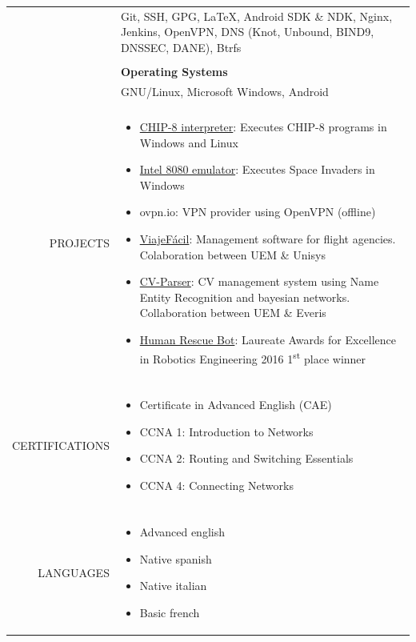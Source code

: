 \documentclass[a4paper, 11pt]{article}
\begin{document}
\begin{longtable}{rp{11cm}}
    & Git, SSH, GPG, \LaTeX, Android SDK \& NDK, Nginx, Jenkins, OpenVPN, DNS (Knot, Unbound, BIND9, DNSSEC, DANE), Btrfs\\
    \\
    & {\bf Operating Systems}\\
    & GNU/Linux, Microsoft Windows, Android\\
    \\
    PROJECTS
    & \vspace{-8mm}
    \begin{itemize}[leftmargin=0cm,label={}]
        \item \href{https://github.com/hugo19941994/CHIP8-Emu}{CHIP-8 interpreter}: Executes CHIP-8 programs in Windows and Linux
        \item \href{https://github.com/hugo19941994/SpaceInvaders-Emu}{Intel 8080 emulator}: Executes Space Invaders in Windows
        \item {ovpn.io}: VPN provider using OpenVPN (offline)
        \item \href{https://github.com/hugo19941994/ViajeFacil}{ViajeFácil}: Management software for flight agencies. Colaboration between UEM \& Unisys
        \item \href{https://github.com/hugo19941994/CV-Parser}{CV-Parser}: CV management system using Name Entity Recognition and bayesian networks. Collaboration between UEM \& Everis
        \item \href{https://github.com/hugo19941994/robot}{Human Rescue Bot}: Laureate Awards for Excellence in Robotics Engineering 2016 1\textsuperscript{st} place winner
    \end{itemize}\\
    \\
    CERTIFICATIONS
    & \vspace{-8mm}
    \begin{itemize}[leftmargin=0cm,label={},noitemsep]
        \item Certificate in Advanced English (CAE)
        \item CCNA 1: Introduction to Networks
        \item CCNA 2: Routing and Switching Essentials
        \item CCNA 4: Connecting Networks
    \end{itemize}\\
    \\
    LANGUAGES
    & \vspace{-8mm}
    \begin{itemize}[leftmargin=0cm,label={},noitemsep]
        \item Advanced english
        \item Native spanish
        \item Native italian
        \item Basic french
    \end{itemize}
\end{longtable}
\end{document}
